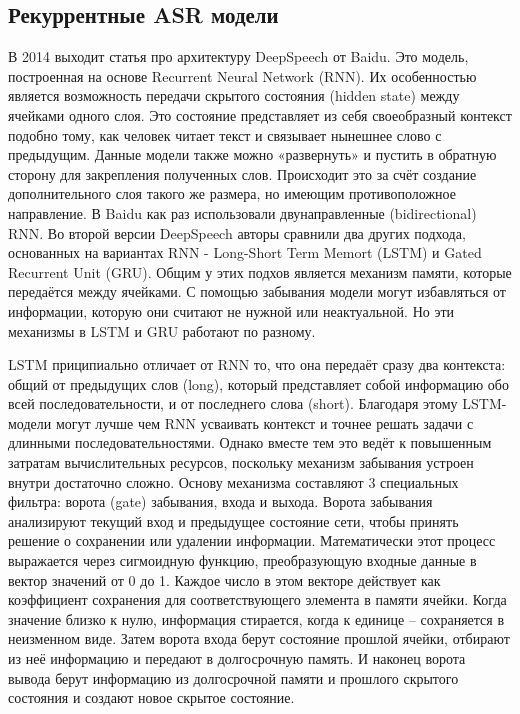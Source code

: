 \subsection{Рекуррентные ASR модели}
В 2014 выходит статья про архитектуру DeepSpeech\cite{hannun2014deep} от Baidu. 
Это модель, построенная на основе Recurrent Neural Network (RNN).
Их особенностью является возможность передачи скрытого состояния (hidden state) между ячейками одного слоя.
Это состояние представляет из себя своеобразный контекст подобно тому, как человек читает текст и связывает нынешнее слово с предыдущим.
Данные модели также можно «развернуть» и пустить в обратную сторону для закрепления полученных слов.
Происходит это за счёт создание дополнительного слоя такого же размера, но имеющим противоположное направление.
В Baidu как раз использовали двунаправленные (bidirectional) RNN.
Во второй версии DeepSpeech\cite{amodei2016deep} авторы сравнили два других подхода, основанных на вариантах RNN - Long-Short Term Memort (LSTM) и Gated Recurrent Unit (GRU).
Общим у этих подхов является механизм памяти, которые передаётся между ячейками.
С помощью забывания модели могут избавляться от информации, которую они считают не нужной или неактуальной.
Но эти механизмы в LSTM и GRU работают по разному.

LSTM приципиально отличает от RNN то, что она передаёт сразу два контекста: общий от предыдущих слов (long), который представляет собой информацию обо всей последовательности, и от последнего слова (short).
Благодаря этому LSTM-модели могут лучше чем RNN усваивать контекст и точнее решать задачи с длинными последовательностями.
Однако вместе тем это ведёт к повышенным затратам вычислительных ресурсов, поскольку механизм забывания устроен внутри достаточно сложно.
Основу механизма составляют 3 специальных фильтра: ворота (gate) забывания, входа и выхода.
Ворота забывания анализируют текущий вход и предыдущее состояние сети, чтобы принять решение о сохранении или удалении информации.
Математически этот процесс выражается через сигмоидную функцию, преобразующую входные данные в вектор значений от 0 до 1.
Каждое число в этом векторе действует как коэффициент сохранения для соответствующего элемента в памяти ячейки.
Когда значение близко к нулю, информация стирается, когда к единице -- сохраняется в неизменном виде.
Затем ворота входа берут состояние прошлой ячейки, отбирают из неё информацию и передают в долгосрочную память.
И наконец ворота вывода берут информацию из долгосрочной памяти и прошлого скрытого состояния и создают новое скрытое состояние.

